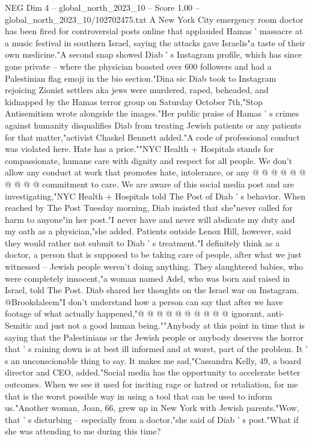 \begin{textsample}{NEG Dim 4 – global\_north\_2023\_10 – Score 1.00 – global\_north\_2023\_10/102702475.txt}  \label{ex:f4_neg_018}
A New York City emergency room doctor has been fired for controversial posts online that applauded Hamas ' massacre at a music festival in southern Israel, saying the attacks gave Israelis"a taste of their own medicine."A second snap showed Diab ' s Instagram profile, which has since gone private -- where the physician boasted over 600 followers and had a Palestinian flag emoji in the bio section."Dina sic Diab took to Instagram rejoicing Zionist settlers aka jews were murdered, raped, beheaded, and kidnapped by the Hamas terror group on Saturday October 7th,"Stop Antisemitism wrote alongside the images."Her public praise of Hamas ' s crimes against humanity disqualifies Diab from treating Jewish patients or any patients for that matter,"activist Chaskel Bennett added."A code of professional conduct was violated here.
Hate has a price.""NYC Health + Hospitals stands for compassionate, humane care with dignity and respect for all people.
We don't allow any conduct at work that promotes hate, intolerance, or any @ @ @ @ @ @ @ @ @ @ commitment to care.
We are aware of this social media post and are investigating,"NYC Health + Hospitals told The Post of Diab ' s behavior.
When reached by The Post Tuesday morning, Diab insisted that she"never called for harm to anyone"in her post."I never have and never will abdicate my duty and my oath as a physician,"she added.
Patients outside Lenox Hill, however, said they would rather not submit to Diab ' s treatment."I definitely think as a doctor, a person that is supposed to be taking care of people, after what we just witnessed -- Jewish people weren't doing anything.
They slaughtered babies, who were completely innocent,"a woman named Adel, who was born and raised in Israel, told The Post.
Diab shared her thoughts on the Israel war on Instagram. @Brookdaleem"I don't understand how a person can say that after we have footage of what actually happened,"@ @ @ @ @ @ @ @ @ @ ignorant, anti-Semitic and just not a good human being.""Anybody at this point in time that is saying that the Palestinians or the Jewish people or anybody deserves the horror that ' s raining down is at best ill informed and at worst, part of the problem.
It ' s an unconscionable thing to say.
It makes me sad,"Cassandra Kelly, 49, a board director and CEO, added."Social media has the opportunity to accelerate better outcomes.
When we see it used for inciting rage or hatred or retaliation, for me that is the worst possible way in using a tool that can be used to inform us."Another woman, Joan, 66, grew up in New York with Jewish parents."Wow, that ' s disturbing -- especially from a doctor,"she said of Diab ' s post."What if she was attending to me during this time?

\end{textsample}
